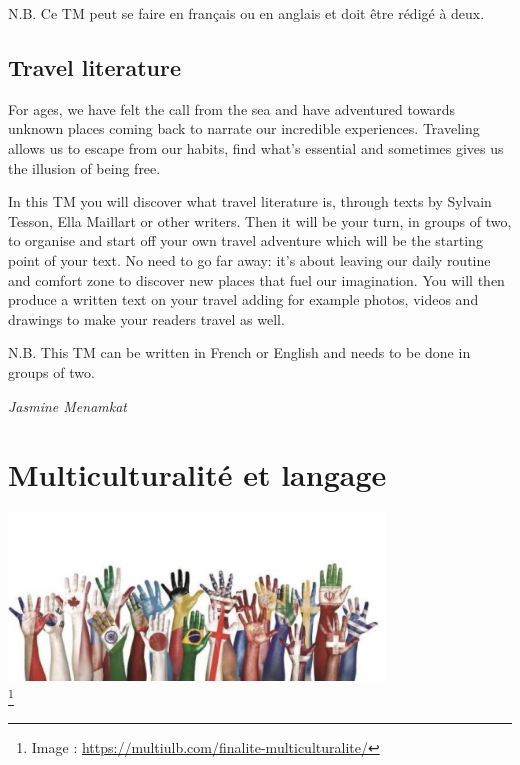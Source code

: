 \documentclass[
  10pt,
  french,
  a5paper,
  openany]{book}
\newenvironment{signature}{\begin{flushright}}{\end{flushright}}
\begin{document}
N.B. Ce TM peut se faire en français ou en anglais et doit être rédigé à deux.

\hypertarget{travel-literature}{%
\section*{Travel literature}\label{travel-literature}}

For ages, we have felt the call from the sea and have adventured towards unknown places coming back to narrate our incredible experiences. Traveling allows us to escape from our habits, find what's essential and sometimes gives us the illusion of being free.

In this TM you will discover what travel literature is, through texts by Sylvain Tesson, Ella Maillart or other writers. Then it will be your turn, in groups of two, to organise and start off your own travel adventure which will be the starting point of your text. No need to go far away: it's about leaving our daily routine and comfort zone to discover new places that fuel our imagination. You will then produce a written text on your travel adding for example photos, videos and drawings to make your readers travel as well.

N.B. This TM can be written in French or English and needs to be done in groups of two.

\begin{signature}
\emph{Jasmine Menamkat}

\end{signature}

\hypertarget{multiculturalituxe9-et-langage}{%
\chapter{Multiculturalité et langage}\label{multiculturalituxe9-et-langage}}

\begin{center}
\includegraphics[width=\textwidth,height=12em]{images/multiculturalite-et-langage.jpg}\\
\footnote{Image : \url{https://multiulb.com/finalite-multiculturalite/}}

\end{center}
\end{document}
